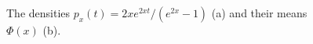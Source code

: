 \begin{figure}[t]
\centering
%
\caption{The densities $p_x(t)=2xe^{2xt}/(e^{2x}-1)$ (a) and their means
$\Phi(x)$ (b).}
\label{fig:tilted-mean}
\end{figure}
